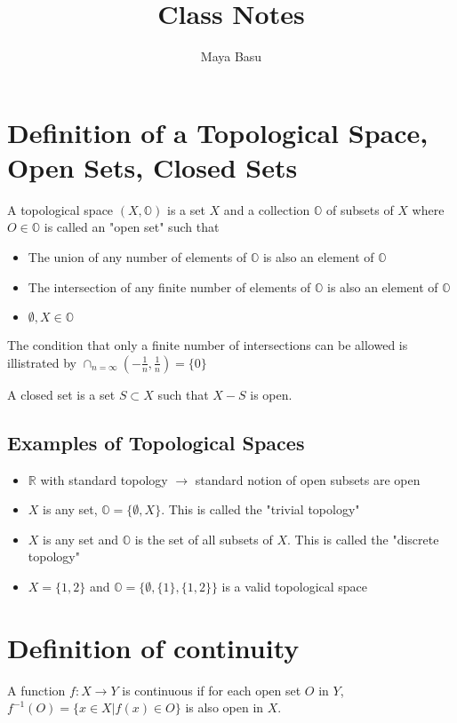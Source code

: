\documentclass{homework}
\author{Maya Basu}
\title{Class Notes}
\newcommand{\OO}{\mathbb{O}}
\begin{document}
 \maketitle

\section{Definition of a Topological Space, Open Sets, Closed Sets}

A topological space $(X, \OO)$ is a set $X$ and a collection $\OO$ of subsets of $X$ where $O \in \OO$ is called an "open set" such that
\begin{itemize}
\item{The union of any number of elements of $\OO$ is also an element of $\OO$}
\item{The intersection of any finite number of elements of $\OO$ is also an element of $\OO$}
\item{$\emptyset , X \in \OO$}
\end{itemize}
The condition that only a finite number of intersections can be allowed is illistrated by $\cap_{n = \infty} \left( -\frac{1}{n},\frac{1}{n}\right) = \{0\}$

A closed set is a set $S \subset X$ such that $X-S$ is open.

\subsection{Examples of Topological Spaces}
\begin{itemize}
\item{$\mathbb{R}$ with standard topology $\rightarrow$ standard notion of open subsets are open}
\item{$X$ is any set, $\OO = \{\emptyset,X\}$. This is called the "trivial topology"}
\item{$X$ is any set and $\OO$ is the set of all subsets of $X$. This is called the "discrete topology"}
\item{$X = \{1,2\}$ and $\OO = \{\emptyset, \{1\}, \{1,2\}\}$ is a valid topological space}
\end{itemize}

\section{Definition of continuity}
A function $f: X \rightarrow Y$ is continuous if for each open set $O$ in $Y$, $f^{-1}(O) = \{x \in X | f(x) \in O\}$ is also open in $X$.
\end{document}
